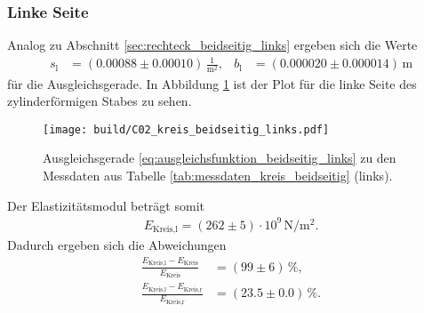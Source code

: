 \subsubsection{Linke Seite}
Analog zu Abschnitt \ref{sec:rechteck_beidseitig_links} ergeben sich die Werte
\begin{align*}
    s_\text{l} &= (\num{0.00088} \pm \num{0.00010}) \, \frac{1}{\unit{\meter^2}}, & 
    b_\text{l} &= (\num{0.000020} \pm \num{0.000014}) \, \unit{\meter}
\end{align*}
für die Ausgleichsgerade.
In Abbildung \ref{fig:plot_kreis_beidseitig_links} ist der Plot für die linke Seite des zylinderförmigen Stabes zu sehen.
%
\begin{figure}[H]
    \centering
    \texttt{[image: build/C02\_kreis\_beidseitig\_links.pdf]}
    \caption{Ausgleichsgerade \eqref{eq:ausgleichsfunktion_beidseitig_links} zu den Messdaten aus Tabelle \ref{tab:messdaten_kreis_beidseitig} (links).}
    \label{fig:plot_kreis_beidseitig_links}
\end{figure}

\noindent
Der Elastizitätsmodul beträgt somit
\begin{align}
    E_\text{Kreis,l} = (\num{262} \pm \num{5}) \cdot 10^9 \, \unit{\newton\per\meter^2}.
\end{align}
Dadurch ergeben sich die Abweichungen
\begin{align*}
    \frac{E_\text{Kreis,l} - E_\text{Kreis}}{E_\text{Kreis}} &= (\num{99} \pm \num{6}) \, \%, \\
    \frac{E_\text{Kreis,l} - E_\text{Kreis,r}}{E_\text{Kreis,r}} &= (\num{23.5} \pm \num{0.0}) \, \%.
\end{align*}
